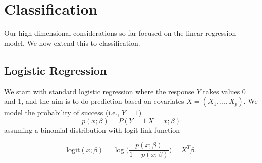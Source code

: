 \documentclass[
]{book}
\newenvironment{Shaded}{\begin{snugshade}}{\end{snugshade}}
\newcommand{\AttributeTok}[1]{\textcolor[rgb]{0.77,0.63,0.00}{#1}}
\newcommand{\CommentTok}[1]{\textcolor[rgb]{0.56,0.35,0.01}{\textit{#1}}}
\newcommand{\DocumentationTok}[1]{\textcolor[rgb]{0.56,0.35,0.01}{\textbf{\textit{#1}}}}
\newcommand{\FloatTok}[1]{\textcolor[rgb]{0.00,0.00,0.81}{#1}}
\newcommand{\FunctionTok}[1]{\textcolor[rgb]{0.00,0.00,0.00}{#1}}
\newcommand{\NormalTok}[1]{#1}
\newcommand{\OtherTok}[1]{\textcolor[rgb]{0.56,0.35,0.01}{#1}}
\newcommand{\SpecialCharTok}[1]{\textcolor[rgb]{0.00,0.00,0.00}{#1}}
\newcommand{\StringTok}[1]{\textcolor[rgb]{0.31,0.60,0.02}{#1}}
\begin{document}
\begin{Shaded}
\end{Shaded}

\hypertarget{classification}{%
\chapter{Classification}\label{classification}}

Our high-dimensional considerations so far focused on the linear regression model. We now extend this to classification.

\hypertarget{logistic-regression}{%
\section{Logistic Regression}\label{logistic-regression}}

We start with standard logistic regression where the response \(Y\) takes values \(0\) and \(1\), and the aim is to do prediction based on covariates \(X=(X_1,\ldots,X_p)\). We model the probability of success (i.e., \(Y=1\)) \[p(x;\beta)=P(Y=1|X=x;\beta)\] assuming a binomial distribution with logit link function

\[\text{logit}(x;\beta)=\log \Big(\frac{p(x;\beta)}{1-p(x;\beta)}\Big)=X^T\beta.\]
\end{document}
